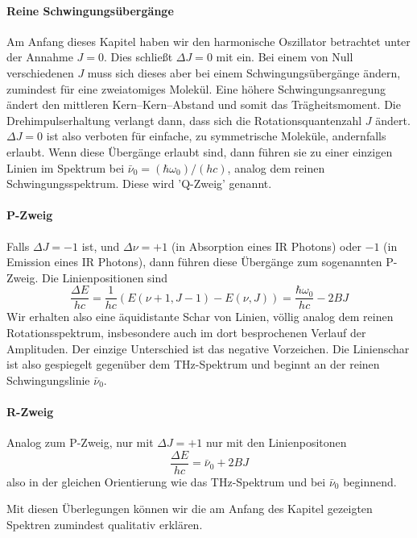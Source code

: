 \paragraph{Reine Schwingungsübergänge} Am Anfang dieses Kapitel haben wir den  harmonische Oszillator betrachtet unter der Annahme $J=0$. Dies schließt $\Delta J = 0$ mit ein. Bei einem von Null verschiedenen $J$ muss sich dieses aber bei einem Schwingungsübergänge ändern, zumindest für eine zweiatomiges Molekül. Eine höhere Schwingungsanregung ändert den mittleren Kern--Kern--Abstand und somit das Trägheitsmoment. Die Drehimpulserhaltung verlangt dann, dass sich die Rotationsquantenzahl $J$ ändert. $\Delta J = 0$ ist also verboten für einfache, zu symmetrische Moleküle, andernfalls erlaubt. Wenn diese Übergänge erlaubt sind, dann führen sie zu einer einzigen Linien im Spektrum bei $ \bar{\nu}_0 = (\hbar \omega_0)/(h c) $, analog dem reinen Schwingungsspektrum. Diese wird 'Q-Zweig' genannt. 

\paragraph{P-Zweig} Falls $\Delta J = -1$ ist, und $\Delta \nu = +1$ (in Absorption eines IR Photons) oder $-1$ (in Emission eines IR Photons), dann führen diese Übergänge zum sogenannten P-Zweig. Die Linienpositionen sind
\begin{equation}
 \frac{\Delta E}{h c} = \frac{1}{h c} ( E(\nu +1, J -1) - E(\nu, J) ) = \frac{\hbar \omega_0}{h c}   - 2 B J
\end{equation}
Wir erhalten also eine äquidistante Schar von Linien, völlig analog dem reinen Rotationsspektrum, insbesondere auch im dort besprochenen Verlauf der Amplituden. Der einzige Unterschied ist das negative Vorzeichen. Die Linienschar ist also gespiegelt gegenüber dem THz-Spektrum und beginnt an der reinen Schwingungslinie $\bar{\nu}_0 $.

\paragraph{R-Zweig} Analog zum P-Zweig, nur mit  $\Delta J = +1$ nur mit den Linienpositonen
\begin{equation}
 \frac{\Delta E}{h c} =  \bar{\nu}_0   + 2 B J
\end{equation}
also in der gleichen Orientierung wie das THz-Spektrum und bei $\bar{\nu}_0 $ beginnend.

Mit diesen Überlegungen können wir die am Anfang des Kapitel gezeigten Spektren zumindest qualitativ erklären.



